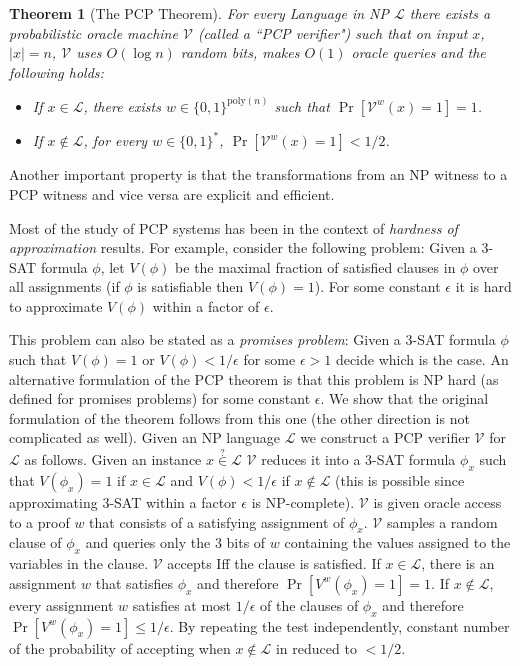 \documentclass{article}
\renewcommand{\L}{\mathcal{L}}
\newcommand{\V}{\mathcal{V}}
\newcommand{\poly}{\mathrm{poly}}
\newcommand{\binary}{\{0,1\}}
\newtheorem{theorem}{Theorem}[section]
\begin{document}
\begin{theorem}[The PCP Theorem]
For every Language in NP $\L$ there exists a probabilistic oracle machine $\V$ (called a ``PCP verifier") such that on input $x$, $|x|=n$, $\V$ uses $O(\log{n})$ random bits, makes $O(1)$ oracle queries and the following holds:
\begin{itemize}
\item If $x \in \L$, there exists $w \in \binary^{\poly(n)}$ such that $\Pr[\V^w(x) = 1] = 1$.
\item If $x \notin \L$, for every $w \in \binary^*$, $\Pr[\V^w(x) = 1] < 1/2$.
\end{itemize}
\end{theorem}
Another important property is that the transformations from an NP witness to a PCP witness and vice versa are explicit and efficient.

Most of the study of PCP systems has been in the context of {\em hardness of approximation} results. For example, consider the following problem: Given a 3-SAT formula $\phi$, let $V(\phi)$ be the maximal fraction of satisfied clauses in $\phi$ over all assignments (if $\phi$ is satisfiable then $V(\phi) = 1$). For some constant $\epsilon$ it is hard to approximate $V(\phi)$ within a factor of $\epsilon$.

This problem can also be stated as a {\em promises problem}: Given a 3-SAT formula $\phi$ such that $V(\phi) = 1$ or $V(\phi) < 1/\epsilon$ for some $\epsilon > 1$ decide which is the case. An alternative formulation of the PCP theorem is that this problem is NP hard (as defined for promises problems) for some constant $\epsilon$. We show that the original formulation of the theorem follows from this one (the other direction is not complicated as well). Given an NP language $\L$ we construct a PCP verifier $\V$ for $\L$ as follows. Given an instance $x \stackrel{?}{\in} \L$ $\V$ reduces it into a 3-SAT formula $\phi_x$ such that $V(\phi_x) = 1$ if $x \in \L$ and $V(\phi) < 1/\epsilon$ if $x \notin \L$ (this is possible since approximating 3-SAT within a factor $\epsilon$ is NP-complete). $\V$ is given oracle access to a proof $w$ that consists of a satisfying assignment of $\phi_x$. $\V$ samples a random clause of $\phi_x$ and queries only the 3 bits of $w$ containing the values assigned to the variables in the clause. $\V$ accepts Iff the clause is satisfied. If $x \in \L$, there is an assignment $w$ that satisfies $\phi_x$ and therefore $\Pr[V^w(\phi_x) = 1]=1$. If $x \notin \L$, every assignment $w$ satisfies at most $1/\epsilon$ of the clauses of $\phi_x$ and therefore $\Pr[V^w(\phi_x) = 1] \leq 1/\epsilon$. By repeating the test independently, constant number of the probability of accepting when $x \notin \L$ in reduced to $<1/2$.
\end{document}
